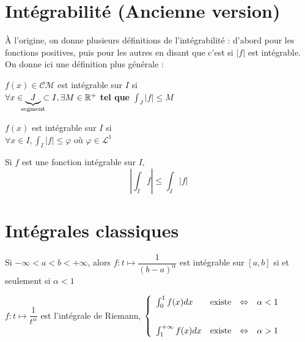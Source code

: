 \documentclass[11pt,a4paper,fleqn,pdftex]{report}
\begin{document}
\section{Intégrabilité (Ancienne version)}
À l'origine, on donne plusieurs définitions de l'intégrabilité : d'abord pour les fonctions positives, puis pour les autres en disant que c'est si $|f|$ est intégrable. On donne ici une définition plus générale : 
\begin{dfn}
$f(x)\in \mathcal{CM}$ est intégrable sur $I$ si \\
$\forall x \in \underbrace{J}_{\mathclap{\text{segment}}} \subset I, \exists M \in \mathbb{R}^+$ \textbf{tel que} $\int_J |f| \le M$
\end{dfn}
\needspace{5cm}
\begin{itheorem}
$f(x)$ est intégrable sur $I$ si \\
$\forall x \in I, \boxed{\int_I |f| \le \varphi}$ où $\varphi \in \mathscr{L}^1$
\end{itheorem}
\begin{theorem}
Si $f$ est une fonction intégrable sur $I$,
    \begin{equation}\label{eq:SommeIntegrale}
        \left| \int_I f \right| \le \int_I \left| f \right| 
    \end{equation}
\end{theorem}
\section{Intégrales classiques}
\begin{theorem}
Si $-\infty < a < b < +\infty$, alors $f:t\mapsto \dfrac{1}{(b-a)^\alpha}$ est intégrable sur $[a,b]$ si et seulement si $\boxed{\alpha < 1}$
\end{theorem}
\begin{theorem}
$f : t \mapsto \dfrac{1}{t^\alpha}$ est l'intégrale de Riemann,
$
\left\lbrace
\begin{array}{l c c l}
\int_0^1f(x)dx&\text{existe}&\Leftrightarrow&\alpha < 1\\[0.7cm]
\int_1^{+\infty}f(x)dx&\text{existe}&\Leftrightarrow&\alpha > 1
\end{array}
\right.
$
\end{theorem}
\end{document}
